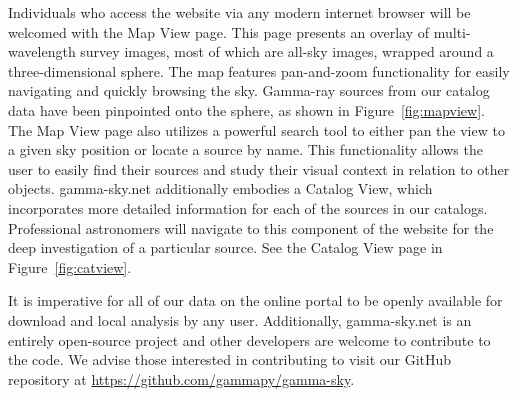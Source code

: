 Individuals who access the website via any modern internet browser will be welcomed with the Map View page. This page presents an overlay of multi-wavelength survey images, most of which are all-sky images, wrapped around a three-dimensional sphere. The map features pan-and-zoom functionality for easily navigating and quickly browsing the sky. Gamma-ray sources from our catalog data have been pinpointed onto the sphere, as shown in Figure~\ref{fig:mapview}. The Map View page also utilizes a powerful search tool to either pan the view to a given sky position or locate a source by name. This functionality allows the user to easily find their sources and study their visual context in relation to other objects. gamma-sky.net additionally embodies a Catalog View, which incorporates more detailed information for each of the sources in our catalogs. Professional astronomers will navigate to this component of the website for the deep investigation of a particular source. See the Catalog View page in Figure~\ref{fig:catview}.

It is imperative for all of our data on the online portal to be openly available for download and local analysis by any user. Additionally, gamma-sky.net is an entirely open-source project and other developers are welcome to contribute to the code. We advise those interested in contributing to visit our GitHub repository at \url{https://github.com/gammapy/gamma-sky}.
